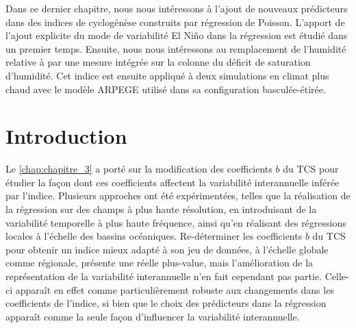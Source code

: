 \documentclass[../main.tex]{subfiles}
\begin{document}
\vspace{-0.5cm}

\begin{itshape}
    Dans ce dernier chapitre, nous nous intéressons à l'ajout de nouveaux prédicteurs dans des indices de cyclogénèse construits par régression de Poisson.
    L'apport de l'ajout explicite du mode de variabilité El Niño dans la régression est étudié dans un premier temps. Ensuite, nous nous intéressons au
    remplacement de l'humidité relative à  par une mesure intégrée sur la colonne du déficit de saturation d'humidité. Cet indice est ensuite appliqué
    à deux simulations en climat plus chaud avec le modèle ARPEGE utilisé dans sa configuration basculée-étirée.
\end{itshape}

\minitoc
\newpage

\section{Introduction}

Le \cref{chap:chapitre_3} a porté sur la modification des coefficients $b$ du TCS pour étudier la façon dont ces coefficients affectent la variabilité
interannuelle inférée par l'indice. Plusieurs approches ont été expérimentées, telles que la réalisation de la régression sur des champs à plus haute
résolution, en introduisant de la variabilité temporelle à plus haute fréquence, ainsi qu'en réalisant des régressions locales à l'échelle des bassins
océaniques. Re-déterminer les coefficients $b$ du TCS pour obtenir un indice mieux adapté à son jeu de données, à l'échelle globale comme régionale, présente
une réelle plus-value, mais l'amélioration de la représentation de la variabilité interannuelle n'en fait cependant pas partie. Celle-ci apparaît en effet comme
particulièrement robuste aux changements dans les coefficients de l'indice, si bien que le choix des prédicteurs dans la régression apparaît comme la seule
façon d'influencer la variabilité interannuelle.
\end{document}
